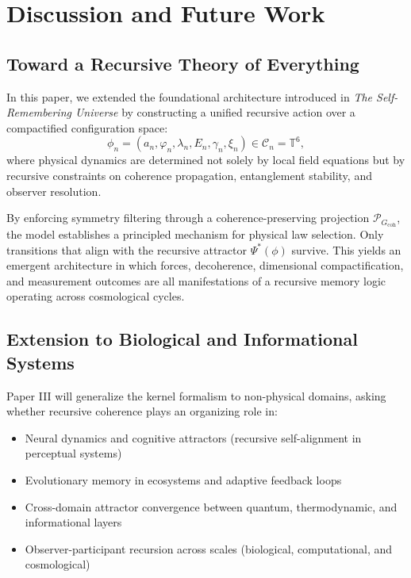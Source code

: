 \section{Discussion and Future Work}
\label{sec:discussion}

\subsection{Toward a Recursive Theory of Everything}

In this paper, we extended the foundational architecture introduced in \textit{The Self-Remembering Universe} by constructing a unified recursive action over a compactified configuration space:
\[
\phi_n = (a_n, \varphi_n, \lambda_n, E_n, \gamma_n, \xi_n) \in \mathcal{C}_n = \mathbb{T}^6,
\]
where physical dynamics are determined not solely by local field equations but by recursive constraints on coherence propagation, entanglement stability, and observer resolution.

By enforcing symmetry filtering through a coherence-preserving projection \( \mathcal{P}_{G_{\text{coh}}} \), the model establishes a principled mechanism for physical law selection. Only transitions that align with the recursive attractor \( \Psi^*(\phi) \) survive. This yields an emergent architecture in which forces, decoherence, dimensional compactification, and measurement outcomes are all manifestations of a recursive memory logic operating across cosmological cycles.

\subsection{Extension to Biological and Informational Systems}

Paper III will generalize the kernel formalism to non-physical domains, asking whether recursive coherence plays an organizing role in:

\begin{itemize}
  \item Neural dynamics and cognitive attractors (recursive self-alignment in perceptual systems)
  \item Evolutionary memory in ecosystems and adaptive feedback loops
  \item Cross-domain attractor convergence between quantum, thermodynamic, and informational layers
  \item Observer-participant recursion across scales (biological, computational, and cosmological)
\end{itemize}

